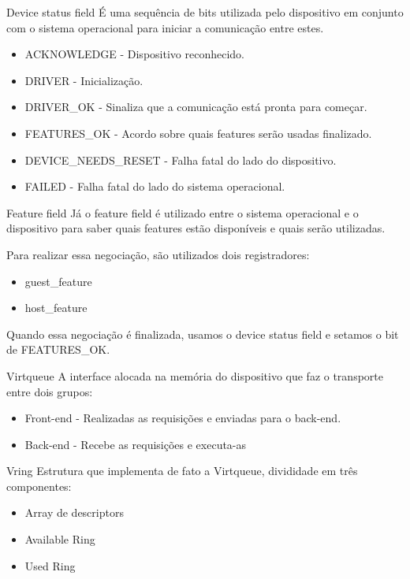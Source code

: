 \documentclass[brazil,nolapesd,aspectratio=169,noartschool]{lapesd-slides}
\begin{document}
\begin{frame}{Device status field}
É uma sequência de bits utilizada pelo dispositivo em conjunto com o sistema operacional para iniciar a comunicação entre estes.


\begin{itemize}
  \item ACKNOWLEDGE - Dispositivo reconhecido.
  \item DRIVER - Inicialização.
  \item DRIVER{\_}OK - Sinaliza que a comunicação está pronta para começar.
  \item FEATURES{\_}OK - Acordo sobre quais features serão usadas finalizado.
  \item DEVICE{\_}NEEDS{\_}RESET - Falha fatal do lado do dispositivo.
  \item FAILED - Falha fatal do lado do sistema operacional.
\end{itemize}
\end{frame}

\begin{frame}{Feature field}
Já o feature field é utilizado entre o sistema operacional e o dispositivo para saber quais features estão disponíveis e quais serão utilizadas.

Para realizar essa negociação, são utilizados dois registradores:
\begin{itemize}
  \item guest{\_}feature
  \item host{\_}feature
\end{itemize}


Quando essa negociação é finalizada, usamos o device status field e setamos o bit de FEATURES{\_}OK.
\end{frame}

\begin{frame}{Virtqueue}
A interface alocada na memória do dispositivo que faz o transporte entre dois grupos:

\begin{itemize}
  \item Front-end - Realizadas as requisições e enviadas para o back-end.
  \item Back-end - Recebe as requisições e executa-as
\end{itemize}


\end{frame}

\begin{frame}{Vring}
Estrutura que implementa de fato a Virtqueue, divididade em três componentes:

\begin{itemize}
  \item Array de descriptors
  \item Available Ring
  \item Used Ring
\end{itemize}
\end{frame}
\end{document}
